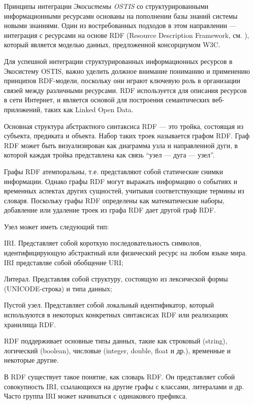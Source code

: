 Принципы интеграции \textit{Экосистемы OSTIS} со структурированными информационными ресурсами основаны на пополнении базы знаний системы новыми знаниями. Один из востребованных подходов в этом направлении --- интеграция с ресурсами на основе RDF (Resource Description Framework, см. ), который является моделью данных, предложенной консорциумом W3C.

Для успешной интеграции структурированных информационных ресурсов в Экосистему OSTIS, важно уделить должное внимание пониманию и применению принципов RDF-модели, поскольку они играют ключевую роль в организации связей между различными ресурсами. RDF используется для описания ресурсов в сети Интернет, и является основой для построения семантических веб-приложений, таких как Linked Open Data.

Основная структура абстрактного синтаксиса RDF --- это тройка, состоящая из субъекта, предиката и объекта. Набор таких троек называется графом RDF. Граф RDF может быть визуализирован как диаграмма узла и направленной дуги, в которой каждая тройка представлена как связь ``узел --- дуга --- узел''.

Графы RDF атемпоральны, т.е. представляют собой статические снимки информации. Однако графы RDF могут выражать информацию о событиях и временных аспектах других сущностей, учитывая соответствующие термины из словаря. Поскольку графы RDF определены как математические наборы, добавление или удаление троек из графа RDF дает другой граф RDF.

Узел может иметь следующий тип:
\begin{textitemize}
    \item IRI. Представляет собой короткую последовательность символов, идентифицирующую абстрактный или физический ресурс на любом языке мира. IRI представляе собой обобщение URI;
    \item Литерал. Представляя собой структуру, состоящую из лексической формы (UNICODE-строка) и типа данных;
    \item Пустой узел. Представляет собой локальный идентификатор, который используются в некоторых конкретных синтаксисах RDF или реализациях хранилища RDF.
\end{textitemize}

RDF поддерживает основные типы данных, такие как строковый (string), логический (boolean), числовые (integer, double, float и др.), временные и некоторые другие.

В RDF существует такое понятие, как словарь RDF. Он представляет собой совокупность IRI, ссылающихся на другие графы с классами, литералами и др. Часто группа IRI может начинаться с одинакового префикса.

